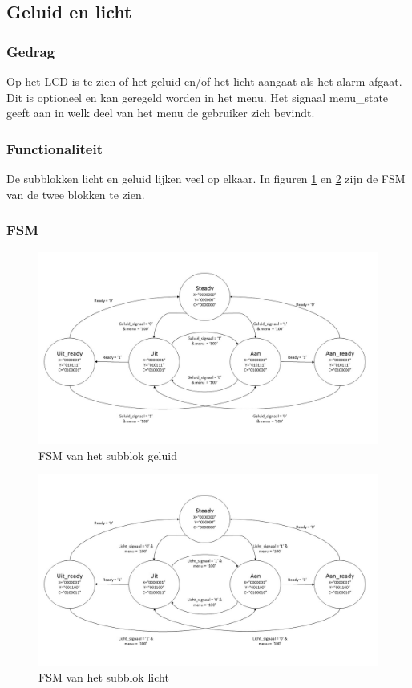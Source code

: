 \subsection{Geluid en licht}

\subsubsection{Gedrag}
Op het LCD is te zien of het geluid en/of het licht aangaat als het alarm afgaat. Dit is optioneel en kan geregeld worden in het menu. Het signaal menu\_state geeft aan in welk deel van het menu de gebruiker zich bevindt.

\subsubsection{Functionaliteit}
De subblokken licht en geluid lijken veel op elkaar. In figuren \ref{fig:FSMgeluid} en \ref{fig:FSMlicht} zijn de FSM van de twee blokken te zien.

\subsubsection{FSM}

\begin{figure}[h!]
\includegraphics[width=15cm]{verslagschemas/FSMs/geluid.jpg}
\caption{FSM van het subblok geluid}
\label{fig:FSMgeluid}
\end{figure}

\begin{figure}[h!]
\includegraphics[width=15cm]{verslagschemas/FSMs/licht.jpg}
\caption{FSM van het subblok licht}
\label{fig:FSMlicht}
\end{figure}

